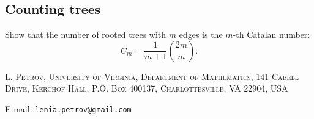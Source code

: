 \documentclass[letterpaper,11pt,oneside,reqno]{article}
\numberwithin{equation}{section}
\theoremstyle{definition}
\begin{document}
\subsection{Counting trees}
\label{prob:counting-trees}

Show that the number of rooted trees with $m$ edges is the $m$-th Catalan number:
\begin{equation*}
	C_m = \frac{1}{m+1}\binom{2m}{m}.
\end{equation*}










\medskip

\textsc{L. Petrov, University of Virginia, Department of Mathematics, 141 Cabell Drive, Kerchof Hall, P.O. Box 400137, Charlottesville, VA 22904, USA}

E-mail: \texttt{lenia.petrov@gmail.com}
\end{document}

